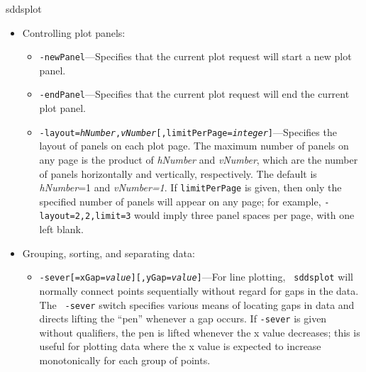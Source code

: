 \begin{sddsprog}{sddsplot}
\begin{itemize}
The {\tt xmode} and {\tt ymode} options allow two types of scaling for x and y independently.  A mode
of {\tt normal} means that the indicated data is treated normally.  The default mode is {\tt unit},
which means that the data is scaled so that its full range is equal to the full coordinate range of
the plot in the appropriate (x or y) dimension.

The data is further adjusted according to any additional qualifiers given.  The {\tt center}
qualifiers offset the data so that the data is centered in the plot space; normally, zero in the data
is mapped to zero in the user's coordinates.  The {\tt factor} qualifiers scale the data by the given
factor about the center value.  The {\tt offset} qualifiers offset the data by specified amounts; if
{\tt mode=normal}, the offset is in user's coordinates, otherwise it is in pspace coordinates.

Users needing only the {\tt factor} facility should consider the {\tt -factor} switch, since it is
easier to use.

\item Controlling plot panels:
  \begin{itemize}
  \item {\tt -newPanel}---Specifies that the current plot request will start a new plot panel.
  \item {\tt -endPanel}---Specifies that the current plot request will end the current plot panel.

  \item {\tt -layout={\em hNumber},{\em vNumber}[,limitPerPage={\em integer}]}---Specifies the layout
of panels on each plot page.  The maximum number of panels on any page is the product of {\em
hNumber} and {\em vNumber}, which are the number of panels horizontally and vertically, respectively.
The default is {\em hNumber}=1 and {\em vNumber=1}.  If {\tt limitPerPage} is given, then only the
specified number of panels will appear on any page; for example, {\tt -layout=2,2,limit=3} would
imply three panel spaces per page, with one left blank.

  \end{itemize}

\item Grouping, sorting, and separating data:

  \begin{itemize} \item {\tt -sever[=xGap={\em value}][,yGap={\em value}]}---For line plotting, {\tt
sddsplot} will normally connect points sequentially without regard for gaps in the data.  The {\tt
-sever} switch specifies various means of locating gaps in data and directs lifting the ``pen''
whenever a gap occurs.  If {\tt -sever} is given without qualifiers, the pen is lifted whenever the x
value decreases; this is useful for plotting data where the x value is expected to increase
monotonically for each group of points.


\end{itemize}
\end{itemize}
\end{sddsprog}
